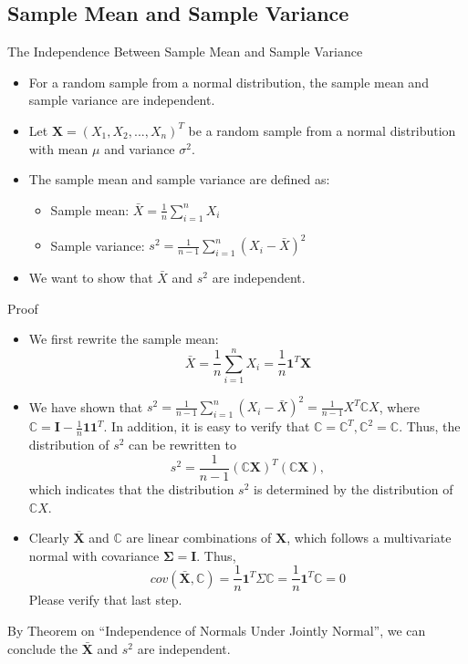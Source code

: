 \documentclass[
  ignorenonframetext,
]{beamer}
\begin{document}
\hypertarget{sample-mean-and-sample-variance}{%
\subsection{Sample Mean and Sample
Variance}\label{sample-mean-and-sample-variance}}

\begin{frame}{The Independence Between Sample Mean and Sample Variance}
\protect\hypertarget{the-independence-between-sample-mean-and-sample-variance}{}
\begin{itemize}
\item
  For a random sample from a normal distribution, the sample mean and
  sample variance are independent.
\item
  Let \(\mathbf X =(X_1, X_2, ..., X_n)^T\) be a random sample from a
  normal distribution with mean \(\mu\) and variance \(\sigma^2\).
\item
  The sample mean and sample variance are defined as:

  \begin{itemize}
  \item
    Sample mean: \(\bar{X} = \frac{1}{n} \sum_{i=1}^{n} X_i\)
  \item
    Sample variance:
    \(s^2 = \frac{1}{n-1} \sum_{i=1}^{n} (X_i - \bar{X})^2\)
  \end{itemize}
\item
  We want to show that \(\bar{X}\) and \(s^2\) are independent.
\end{itemize}
\end{frame}

\begin{frame}{Proof}
\protect\hypertarget{proof}{}
\begin{itemize}
\item
  We first rewrite the sample mean:
  \[\bar{X} = \frac{1}{n} \sum_{i=1}^{n} X_i =\frac{1}{n}\mathbf 1^T \mathbf X \]
\item
  We have shown that
  \(s^2 = \frac{1}{n-1} \sum_{i=1}^{n} (X_i - \bar{X})^2=\frac{1}{n-1}X^T\mathbb CX\),
  where \(\mathbb C=\mathbf I - \frac{1}{n}\mathbf 1 \mathbf 1^T\). In
  addition, it is easy to verify that
  \(\mathbb C=\mathbb C^T, \mathbb C^2=\mathbb C\). Thus, the
  distribution of \(s^2\) can be rewritten to
  \[s^2=\frac{1}{n-1} (\mathbb C\mathbf X)^T (\mathbb C\mathbf X),\]
  which indicates that the distribution \(s^2\) is determined by the
  distribution of \(\mathbb C X\).
\item
  Clearly \(\bar {\mathbf X}\) and \(\mathbb C\) are linear combinations
  of \(\mathbf X\), which follows a multivariate normal with covariance
  \(\boldsymbol\Sigma= \mathbf I\). Thus,
  \[cov(\bar {\mathbf X}, \mathbb C) = \frac{1}{n}\mathbf 1^T \Sigma \mathbb C= \frac{1}{n}\mathbf 1^T \mathbb C=0\]
  Please verify that last step.
\end{itemize}

By Theorem on ``Independence of Normals Under Jointly Normal'', we can
conclude the \(\bar {\mathbf X}\) and \(s^2\) are independent.
\end{frame}
\end{document}
